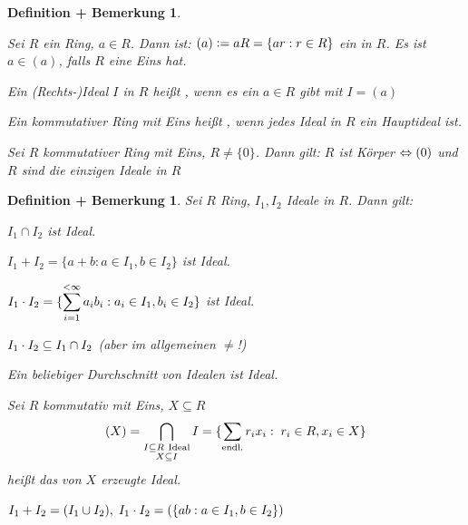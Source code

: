 \documentclass[a4paper,10pt,german]{scrbook}
\theoremstyle{saetze}
\theoremstyle{definitionen}
\newtheorem{DefBem}[Def]{Definition + Bemerkung}
\begin{document}
\begin{DefBem}
\begin{enum}
\item Sei $R$ ein Ring, $a \in R$. Dann ist:
\newline $(a) \mathrel{\mathop:}= a R = \{ ar : r \in R\}$ ein  in
$R$. Es ist $a \in (a)$, falls $R$ eine Eins hat.
\item Ein (Rechts-)Ideal $I$ in $R$ heißt , wenn es
ein $a \in R$ gibt mit $I = (a)$
\item Ein kommutativer Ring mit Eins heißt , wenn
jedes Ideal in $R$ ein Hauptideal ist.
\item Sei $R$ kommutativer Ring mit Eins, $R \neq \{0\}$. Dann gilt:
\newline $R$ ist Körper $\Leftrightarrow (0)$ und $R$ sind die einzigen Ideale
in $R$

\end{enum}
\end{DefBem}

\begin{DefBem}
Sei $R$ Ring, $I_1, I_2$
Ideale in $R$. Dann gilt:
\begin{enum}
\item
\begin{enum}
\item[] $I_1 \cap I_2$ ist Ideal.
\item[] $I_1 + I_2 = \{a+b:a \in I_1, b\in I_2\}$ ist Ideal.
\item[] $I_1 \cdot I_2 = \{\displaystyle \sum_{i=1}^{<\infty} a_i b_i: a_i \in I_1,
b_i \in I_2 \}$ ist Ideal.
\end{enum}
\item $I_1 \cdot I_2 \subseteq I_1 \cap I_2$ (aber im allgemeinen
$\neq$!)
\item Ein beliebiger Durchschnitt von Idealen ist Ideal.
\item Sei $R$ kommutativ mit Eins, $X \subseteq R$
\[(X) = \bigcap_{\substack{I \subseteq R \mbox{ \scriptsize Ideal} \\
X \subseteq I}} I = \{ \sum_{\mbox{\scriptsize endl.}} r_i x_i:\;
r_i \in R, x_i \in X\}\] heißt das von $X$ erzeugte Ideal.
\item $\displaystyle I_1 + I_2 = (I_1 \cup I_2),\; I_1 \cdot I_2 = (\{ab: a \in
I_1, b \in I_2\})$
\end{enum}
\end{DefBem}
\end{document}
